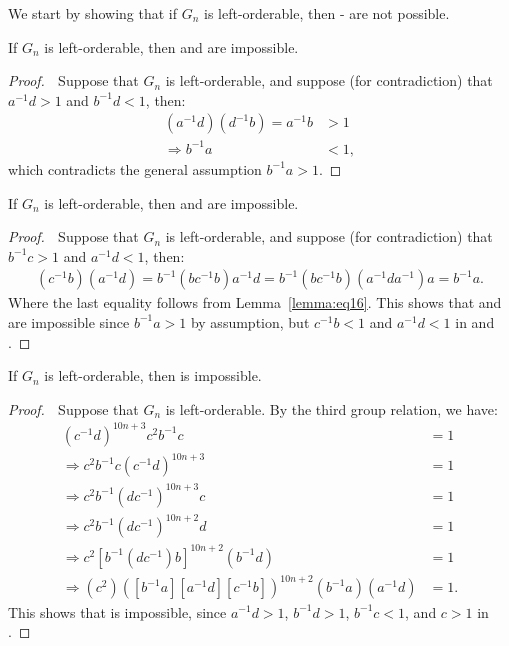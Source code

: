 We start by showing that if $G_n$ is left-orderable, then - are not possible.


\begin{proposition} If $G_n$ is left-orderable, then  and  are impossible.
\end{proposition}
\begin{proof} $\;$ Suppose that $G_n$ is left-orderable, and suppose (for contradiction) that $a^{-1}d>1$ and $b^{-1}d<1$, then:
\begin{align*}
(a^{-1}d)(d^{-1}b)=a^{-1}b&>1\\
\Rightarrow{}b^{-1}a&<1,
\end{align*}
which contradicts the general assumption $b^{-1}a>1$.
\end{proof}

\begin{proposition} If $G_n$ is left-orderable, then  and  are impossible.
\end{proposition}
\begin{proof} $\;$ Suppose that $G_n$ is left-orderable, and suppose (for contradiction) that $b^{-1}c>1$ and $a^{-1}d<1$, then:
\begin{align*}
(c^{-1}b)(a^{-1}d)=b^{-1}(bc^{-1}b)a^{-1}d=b^{-1}(bc^{-1}b)(a^{-1}da^{-1})a=b^{-1}a.
\end{align*}
Where the last equality follows from Lemma~\ref{lemma:eq16}. This shows that  and  are impossible since $b^{-1}a>1$ by assumption, but $c^{-1}b<1$ and $a^{-1}d<1$ in  and .
\end{proof}

\begin{proposition} If $G_n$ is left-orderable, then  is impossible.
\end{proposition}
\begin{proof} $\;$ Suppose that $G_n$ is left-orderable. By the third group relation, we have:
\begin{align}
(c^{-1}d)^{10n+3}c^2b^{-1}c&=1\nonumber{}\\
\Rightarrow{}c^2b^{-1}c(c^{-1}d)^{10n+3}&=1\nonumber{}\\
\Rightarrow{}c^2b^{-1}(dc^{-1})^{10n+3}c&=1\label{eq3:2}\\
\Rightarrow{}c^2b^{-1}(dc^{-1})^{10n+2}d&=1\nonumber{}\\
\Rightarrow{}c^2[b^{-1}(dc^{-1})b]^{10n+2}(b^{-1}d)&=1\label{eq3:3}\\
\Rightarrow{}(c^2)([b^{-1}a][a^{-1}d][c^{-1}b])^{10n+2}(b^{-1}a)(a^{-1}d)&=1.\nonumber{}
\end{align}
This shows that  is impossible, since $a^{-1}d>1$, $b^{-1}d>1$, $b^{-1}c<1$, and $c>1$ in .
\end{proof}

